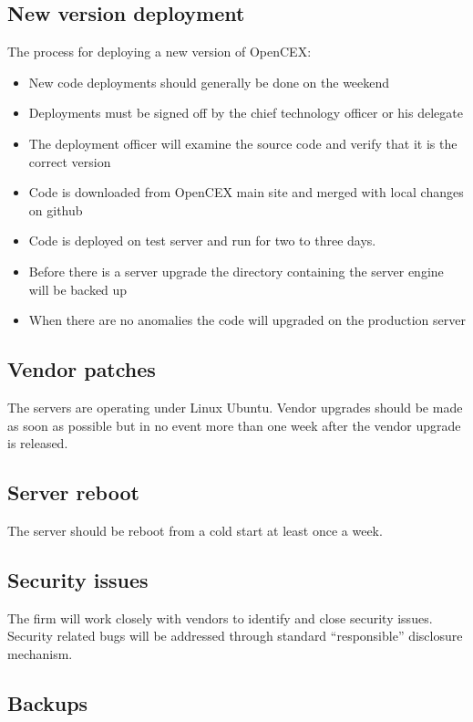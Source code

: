 \subsection{New version deployment}
The process for deploying a new version of OpenCEX:
\begin{itemize}
  \item New code deployments should generally be done on the weekend
  \item Deployments must be signed off by the chief technology officer
    or his delegate
  \item The deployment officer will examine the source code and verify
    that it is the correct version
  \item Code is downloaded from OpenCEX main site and merged with
    local changes on github
  \item Code is deployed on test server and run for two to three days.
  \item Before there is a server upgrade the directory containing the
    server engine will be backed up
  \item When there are no anomalies the code will upgraded on the
    production server
\end{itemize}
    
\subsection{Vendor patches}
The servers are operating under Linux Ubuntu.  Vendor upgrades should
be made as soon as possible but in no event more than one week after
the vendor upgrade is released.

\subsection{Server reboot}
The server should be reboot from a cold start at least once a week.

\subsection{Security issues}
The firm will work closely with vendors to identify and close security
issues.  Security related bugs will be addressed through standard
``responsible'' disclosure mechanism.

\subsection{Backups}


